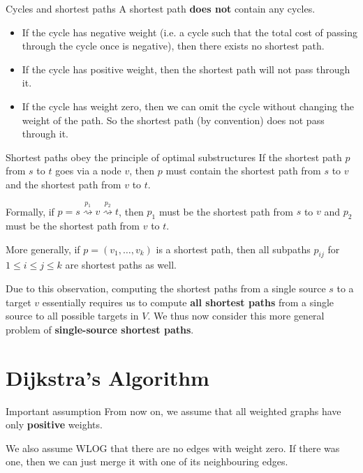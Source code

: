 \documentclass[12pt]{article}
\begin{document}
\begin{remark}{Cycles and shortest paths}{}
    A shortest path \textbf{does not} contain any cycles. 
    \begin{itemize}
        \item If the cycle has negative weight (i.e. a cycle such that the total cost of passing through the cycle once is negative), then there exists no shortest path.
        \item If the cycle has positive weight, then the shortest path will not pass through it.
        \item If the cycle has weight zero, then we can omit the cycle without changing the weight of the path. So the shortest path (by convention) does not pass through it.
    \end{itemize}
\end{remark}

\begin{remark}{Shortest paths obey the principle of optimal substructures}{}
    If the shortest path $p$ from $s$ to $t$ goes via a node $v$, then $p$ must contain the shortest path from $s$ to $v$ and the shortest path from $v$ to $t$.

    Formally, if $p = s \overset{p_1}\rightsquigarrow v \overset{p_2}\rightsquigarrow t$, then $p_1$ must be the shortest path from $s$ to $v$ and $p_2$ must be the shortest path from $v$ to $t$.

    More generally, if $p = (v_1, \dots, v_k)$ is a shortest path, then all subpaths $p_{ij}$ for $1 \leq i \leq j \leq k$ are shortest paths as well.
\end{remark}

Due to this observation, computing the shortest paths from a single source $s$ to a target $v$ essentially requires us to compute \textbf{all shortest paths} from a single source to all possible targets in $V$. We thus now consider this more general problem of \textbf{single-source shortest paths}.


\section{Dijkstra's Algorithm}

\begin{warning*}{Important assumption}{}
    From now on, we assume that all weighted graphs have only \textbf{positive} weights.

    We also assume WLOG that there are no edges with weight zero. If there was one, then we can just merge it with one of its neighbouring edges.
\end{warning*}
\end{document}
